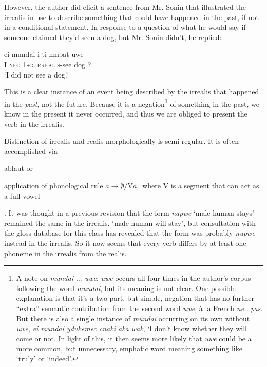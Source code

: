 \documentclass[pdftex,12pt,letterpaper]{article}
\let\ipa\textipa
\begin{document}
 However, the author did elicit a sentence from Mr. Sonin that illustrated the irrealis in use to describe something that could have happened in the past, if not in a conditional statement. In response to a question of what he would say if someone claimed they'd seen a dog, but Mr. Sonin didn't, he replied:
 
 \begin{exe}
 \ex
 \gll ei mundai i-ti n\ipa{1}mbat uwe \\
 I \textsc{neg} \textsc{1sg.irrealis}-see dog ?\\
 \trans `I did not see a dog.'\end{exe}
 
 \noindent This is a clear instance of an event being described by the irrealis that happened in the \emph{past}, not the future. Because it is a negation\footnote{A note on \emph{mundai $\ldots$ uwe}: \emph{uwe} occurs all four times in the author's corpus following the word \emph{mundai}, but its meaning is not clear. One possible explanation is that it's a two part, but simple, negation that has no further ``extra'' semantic contribution from the second word \emph{uwe}, \`a la French \emph{ne...pas}. But there is also a single instance of \emph{mundai} occurring on its own without \emph{uwe}, \emph{ei mundai y\ipa{@}dukemec c\ipa{@}naki aka wak}, `I don't know whether they will come or not. In light of this, it then seems more likely that \emph{uwe} could be a more common, but unnecessary, emphatic word meaning something like `truly' or `indeed'.} of something in the past, we know in the present it never occurred, and thus we are obliged to present the verb in the irrealis.
 
 Distinction of irrealis and realis morphologically is semi-regular. It is often accomplished via \begin{inparaenum}[(a)] \item ablaut or \item application of phonological rule $a \rightarrow \emptyset / \text{V}a,$ where V is a segment that can act as a full vowel\end{inparaenum}. It was thought in a previous revision that the form \emph{napwe} `male human stays' remained the same in the irrealis, `male human will stay', but consultation with the gloss database for this class has revealed that the form was probably \emph{nupwe} instead in the irrealis. So it now seems that every verb differs by at least one phoneme in the irrealis from the realis.
\end{document}
